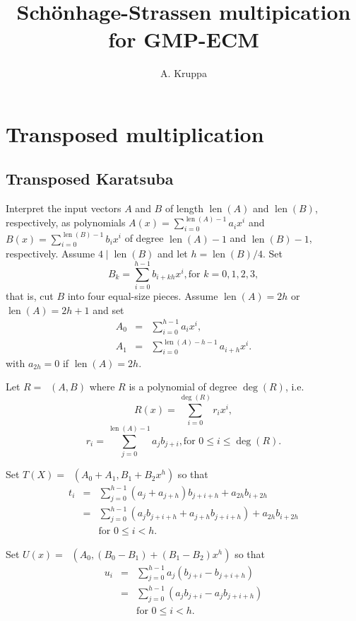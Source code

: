 \documentclass{article}
\DeclareMathOperator{\len}{len}
\DeclareMathOperator{\mult}{mul^{T}}
\begin{document}
\title{Sch\"onhage-Strassen multipication for GMP-ECM}
\author{A. Kruppa}
\maketitle

\section{Transposed multiplication}
\subsection{Transposed Karatsuba}
Interpret the input vectors $A$ and $B$ of length $\len(A)$ and $\len(B)$, 
respectively, as polynomials $A(x) = \sum_{i=0}^{\len(A)-1} a_i x^i$ and
$B(x) = \sum_{i=0}^{\len(B)-1} b_i x^i$ of degree $\len(A)-1$ and $\len(B)-1$, 
respectively. Assume $4\mid \len(B)$ and let $h = \len(B)/4$. 
Set 
\begin{displaymath}
B_k = \sum_{i=0}^{h-1} b_{i+kh} x^i, \textrm{for } k = 0, 1, 2, 3, 
\end{displaymath}
that is, cut $B$ into four equal-size pieces. 
Assume $\len(A) = 2h$ or $\len(A) = 2h+1$ and set
\begin{eqnarray*}
A_0 & = & \sum_{i=0}^{h-1} a_{i} x^i, \\
A_1 & = & \sum_{i=0}^{\len(A)-h-1} a_{i+h} x^i.
\end{eqnarray*}
with $a_{2h} = 0$ if $\len(A) = 2h$.

Let $R = \mult(A, B)$ where $R$ is a polynomial of degree $\deg(R)$, i.e.
%
\begin{displaymath}
R(x) = \sum_{i=0}^{\deg(R)} r_i x^i,
\end{displaymath}
%
\begin{displaymath}
r_i = \sum_{j=0}^{\len(A)-1} a_j b_{j+i}, \textrm{for } 0\leq i \leq \deg(R).
\end{displaymath}

\pagebreak{}

Set $T(X) = \mult(A_0 + A_1, B_1 + B_2 x^h)$
so that
\begin{eqnarray*}
t_i & = & \sum_{j=0}^{h-1} (a_j + a_{j+h}) b_{j+i+h} + a_{2h} b_{i+2h} \\
    & = & \sum_{j=0}^{h-1} (a_j b_{j+i+h} + a_{j+h} b_{j+i+h}) + a_{2h} b_{i+2h} \\
& & \textrm{for } 0\leq i < h.
\end{eqnarray*}

Set $U(x) = \mult(A_0, (B_0 - B_1) + (B_1 - B_2) x^h)$
so that
\begin{eqnarray*}
u_i & = & \sum_{j=0}^{h-1} a_j (b_{j+i} - b_{j+i+h}) \\
    & = & \sum_{j=0}^{h-1} (a_j b_{j+i} - a_j b_{j+i+h}) \\
& & \textrm{for } 0\leq i < h.
\end{eqnarray*}
\end{document}
